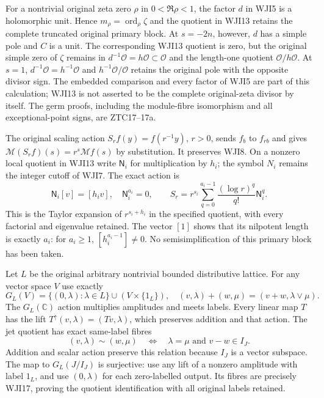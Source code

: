 For a nontrivial original zeta zero $\rho$ in $0<\Re\rho<1$,
the factor $d$ in WJI5 is a holomorphic unit. Hence
$m_\rho=\operatorname{ord}_\rho\zeta$ and the quotient
in WJI13 retains the complete truncated original primary block.
At $s=-2n$, however, $d$ has a simple pole and $C$ is a unit.
The corresponding WJI13 quotient is zero, but the original
simple zero of $\zeta$ remains in
$d^{-1}\mathcal O=h\mathcal O\subset\mathcal O$ and the
length-one quotient $\mathcal O/h\mathcal O$.
At $s=1$, $d^{-1}\mathcal O=h^{-1}\mathcal O$ and
$h^{-1}\mathcal O/\mathcal O$ retains the original pole with
the opposite divisor sign. The embedded comparison and every
factor of WJI5 are part of this calculation; WJI13 is not
asserted to be the complete original-zeta divisor by itself.
The germ proofs, including the module-fibre isomorphism and
all exceptional-point signs, are ZTC17--17a.

The original scaling action $S_r f(y)=f(r^{-1}y)$,
$r>0$, sends $f_b$ to $f_{rb}$ and gives
$\mathcal M(S_rf)(s)=r^s\mathcal Mf(s)$ by substitution.
It preserves WJI8. On a nonzero local quotient in WJI13
write $\mathsf N_i$ for multiplication by $h_i$;
the symbol $N_i$ remains the integer cutoff of WJI7.
The exact action is
\begin{equation}\tag{WJI15}
 \mathsf N_i[v]=[h_iv],\quad
 \mathsf N_i^{a_i}=0,\qquad
 S_r=r^{s_i}\sum_{q=0}^{a_i-1}
                   \frac{(\log r)^q}{q!}\mathsf N_i^q.
\end{equation}
This is the Taylor expansion of $r^{s_i+h_i}$ in the
specified quotient, with every factorial and eigenvalue
retained. The vector $[1]$ shows that its nilpotent length
is exactly $a_i$: for $a_i\ge1$, $[h_i^{a_i-1}]\ne0$.
No semisimplification of this primary block has been taken.

Let $L$ be the original arbitrary nontrivial bounded
distributive lattice. For any vector space $V$ use exactly
\begin{equation}\tag{WJI16}
 G_L(V)=\{(0,\lambda):\lambda\in L\}\cup
                        (V\times\{1_L\}),\quad
 (v,\lambda)+(w,\mu)=(v+w,\lambda\vee\mu).
\end{equation}
The $G_L(\mathbb C)$ action multiplies amplitudes and meets
labels. Every linear map $T$ has the lift
$T^\uparrow(v,\lambda)=(Tv,\lambda)$, which preserves
addition and that action. The jet quotient has exact
same-label fibres
\begin{equation}\tag{WJI17}
 (v,\lambda)\sim(w,\mu)
       \quad\Longleftrightarrow\quad
       \lambda=\mu\text{ and }v-w\in I_J.
\end{equation}
Addition and scalar action preserve this relation because
$I_J$ is a vector subspace. The map to $G_L(J/I_J)$ is
surjective: use any lift of a nonzero amplitude with label
$1_L$, and use $(0,\lambda)$ for each zero-labelled output.
Its fibres are precisely WJI17, proving the quotient
identification with all original labels retained.

